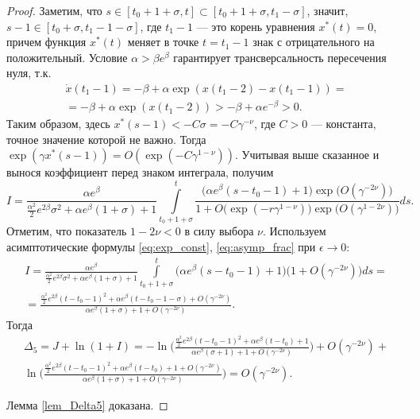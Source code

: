 \begin{proof}
Заметим, что $s \in [t_0 + 1 + \sigma, t] \subset [t_0 + 1 + \sigma, t_1 - \sigma]$, значит, $s - 1 \in [t_0 + \sigma, t_1 - 1 - \sigma]$, где $t_1 - 1$ --- это корень уравнения $x^*(t)=0$, причем функция $x^*(t)$ меняет в точке $t = t_1 - 1$ знак с отрицательного на положительный. Условие $\alpha > \beta e^{\beta}$ гарантирует трансверсальность пересечения нуля, т.к.
%
\begin{multline*}
\dot{x}(t_1 - 1) = -\beta + \alpha \exp(x(t_1 - 2) - x(t_1 - 1)) =\\= -\beta + \alpha \exp(x(t_1 - 2)) > -\beta + \alpha e^{-\beta} > 0.
\end{multline*}
%
Таким образом, здесь $x^*(s - 1) < -C \sigma = -C \gamma^{-\nu}$, где $C > 0$ --- константа, точное значение которой не важно. Тогда $\exp(\gamma x^*(s - 1))=O(\exp(-C \gamma^{1 - \nu}))$. Учитывая выше сказанное и вынося коэффициент перед знаком интеграла, получим  
\begin{equation*}
	I=\frac{\alpha e^\beta}
	{\frac{\alpha^2}{2}e^{2\beta}\sigma^2+\alpha e^{\beta}(1+\sigma)+1}
	\int\limits_{t_0+1+\sigma}^{t}
	\frac{\big(\alpha e^{\beta}(s-t_0-1)+1\big)\exp\big(O(\gamma^{-2\nu})\big)}
	{1+O\big(\exp({-r\gamma^{1-\nu}})\big) \exp\big(O(\gamma^{1-2\nu})\big)}
	ds. 
\end{equation*}
Отметим, что показатель $1-2\nu<0$ в силу выбора $\nu$. Используем асимптотические формулы \eqref{eq:exp_const}, \eqref{eq:asymp_frac} при $\epsilon \to 0$:
%
\begin{multline*}
	I=\frac{\alpha e^\beta}
	{\frac{\alpha^2}{2}e^{2\beta}\sigma^2+\alpha e^{\beta}(1+\sigma)+1}
	\int\limits_{t_0+1+\sigma}^{t}
	\big(\alpha e^{\beta}(s-t_0-1)+1\big)\big(1+O(\gamma^{-2\nu})\big)
	ds=
	\\
	= \frac{\frac{\alpha^2}{2} e^{2\beta}(t-t_0-1)^2+\alpha e^\beta(t-t_0-1-\sigma)+O(\gamma^{-2\nu})}
	{\alpha e^{\beta}(1+\sigma)+1+O(\gamma^{-2\nu})}.
\end{multline*}
%
Тогда
\begin{multline}
	\Delta_5=J+\ln(1+I)=
	-\ln\Big(\frac{\frac{\alpha^2}{2}e^{2\beta}(t-t_0-1)^2+\alpha e^{\beta}(t-t_0)+1}{\alpha e^{\beta}(\sigma+1)+1+O(\gamma^{-2\nu})}\Big)+O(\gamma^{-2\nu})
	+
	\\
	\ln\Big(\frac{\frac{\alpha^2}{2} e^{2\beta}(t-t_0-1)^2+\alpha e^\beta(t-t_0)+1+O(\gamma^{-2\nu})}
	{\alpha e^{\beta}(1+\sigma)+1+O(\gamma^{-2\nu})}\Big)=O(\gamma^{-2\nu}).
\end{multline}        

Лемма \ref{lem_Delta5} доказана.

\end{proof}

